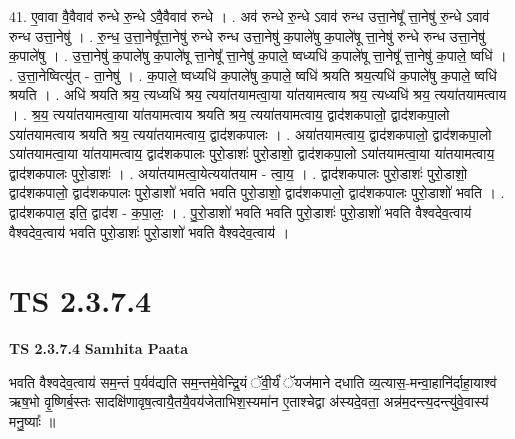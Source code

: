 \documentclass[17pt]{extarticle}
\begin{document}
41. ए॒वावा वै॒वैवाव॑ रुन्धे रु॒न्धे ऽवै॒वैवाव॑ रुन्धे । . अव॑ रुन्धे रु॒न्धे ऽवाव॑ रुन्ध उत्ता॒नेषू᳚ त्ता॒नेषु॑ रु॒न्धे ऽवाव॑ रुन्ध उत्ता॒नेषु॑ । . रु॒न्ध॒ उ॒त्ता॒नेषू᳚त्ता॒नेषु॑ रुन्धे रुन्ध उत्ता॒नेषु॑ क॒पाले॑षु क॒पाले॑षू त्ता॒नेषु॑ रुन्धे रुन्ध उत्ता॒नेषु॑ क॒पाले॑षु । . उ॒त्ता॒नेषु॑ क॒पाले॑षु क॒पाले॑षू त्ता॒नेषू᳚ त्ता॒नेषु॑ क॒पाले॒ ष्वध्यधि॑ क॒पाले॑षू त्ता॒नेषू᳚ त्ता॒नेषु॑ क॒पाले॒ ष्वधि॑ । . उ॒त्ता॒नेष्वित्यु॑त् - ता॒नेषु॑ । . क॒पाले॒ ष्वध्यधि॑ क॒पाले॑षु क॒पाले॒ ष्वधि॑ श्रयति श्रय॒त्यधि॑ क॒पाले॑षु क॒पाले॒ ष्वधि॑ श्रयति । . अधि॑ श्रयति श्रय॒ त्यध्यधि॑ श्रय॒ त्यया॑तयामत्वा॒या या॑तयामत्वाय श्रय॒ त्यध्यधि॑ श्रय॒ त्यया॑तयामत्वाय । . श्र॒य॒ त्यया॑तयामत्वा॒या या॑तयामत्वाय श्रयति श्रय॒ त्यया॑तयामत्वाय॒ द्वाद॑शकपालो॒ द्वाद॑शकपा॒लो ऽया॑तयामत्वाय श्रयति श्रय॒ त्यया॑तयामत्वाय॒ द्वाद॑शकपालः । . अया॑तयामत्वाय॒ द्वाद॑शकपालो॒ द्वाद॑शकपा॒लो ऽया॑तयामत्वा॒या या॑तयामत्वाय॒ द्वाद॑शकपालः पुरो॒डाशः॑ पुरो॒डाशो॒ द्वाद॑शकपा॒लो ऽया॑तयामत्वा॒या या॑तयामत्वाय॒ द्वाद॑शकपालः पुरो॒डाशः॑ । . अया॑तयामत्वा॒येत्यया॑तयाम - त्वा॒य॒ । . द्वाद॑शकपालः पुरो॒डाशः॑ पुरो॒डाशो॒ द्वाद॑शकपालो॒ द्वाद॑शकपालः पुरो॒डाशो॑ भवति भवति पुरो॒डाशो॒ द्वाद॑शकपालो॒ द्वाद॑शकपालः पुरो॒डाशो॑ भवति । . द्वाद॑शकपाल॒ इति॒ द्वाद॑श - क॒पा॒लः॒ । . पु॒रो॒डाशो॑ भवति भवति पुरो॒डाशः॑ पुरो॒डाशो॑ भवति वैश्वदेव॒त्वाय॑ वैश्वदेव॒त्वाय॑ भवति पुरो॒डाशः॑ पुरो॒डाशो॑ भवति वैश्वदेव॒त्वाय॑ । \newline
\pagebreak
{}
\section*{ TS 2.3.7.4 }

\textbf{TS 2.3.7.4 } \newline
\textbf{Samhita Paata} \newline

भवति वैश्वदेव॒त्वाय॑ सम॒न्तं प॒र्यव॑द्यति सम॒न्तमे॒वेन्द्रि॒यं ॅवी॒र्यं॑ ॅयज॑माने दधाति व्य॒त्यास॒-मन्वा॒हानि॑र्दाहा॒याश्व॑ ऋष॒भो वृ॒ष्णिर्ब॒स्तः सादक्षि॑णावृष॒त्वायै॒तयै॒वय॑जेताभिश॒स्यमा॑न ए॒ताश्चेद्वा अ॑स्यदे॒वता॒ अन्न॑म॒दन्त्य॒दन्त्यु॑वे॒वास्य॑ मनु॒ष्याः᳚ ॥ \newline
\end{document}
